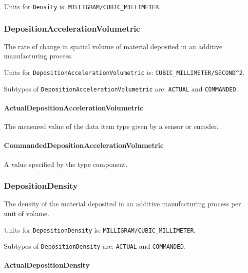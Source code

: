 Units for \texttt{Density} is: \texttt{MILLIGRAM/CUBIC_MILLIMETER}.

\FloatBarrier

\subsubsection{DepositionAccelerationVolumetric}
\label{sec:DepositionAccelerationVolumetric}



The rate of change in spatial volume of material deposited in an additive manufacturing process.


Units for \texttt{DepositionAccelerationVolumetric} is: \texttt{CUBIC_MILLIMETER/SECOND\^{}2}.


Subtypes of \texttt{DepositionAccelerationVolumetric} are: \texttt{ACTUAL} and \texttt{COMMANDED}. 
\FloatBarrier

\paragraph{ActualDepositionAccelerationVolumetric}\mbox{}
\label{sec:ActualDepositionAccelerationVolumetric}



The measured value of the data item type given by a sensor or encoder.


\paragraph{CommandedDepositionAccelerationVolumetric}\mbox{}
\label{sec:CommandedDepositionAccelerationVolumetric}



A value specified by the  type component.


\subsubsection{DepositionDensity}
\label{sec:DepositionDensity}



The density of the material deposited in an additive manufacturing process per unit of volume.


Units for \texttt{DepositionDensity} is: \texttt{MILLIGRAM/CUBIC_MILLIMETER}.


Subtypes of \texttt{DepositionDensity} are: \texttt{ACTUAL} and \texttt{COMMANDED}. 
\FloatBarrier

\paragraph{ActualDepositionDensity}\mbox{}
\label{sec:ActualDepositionDensity}



